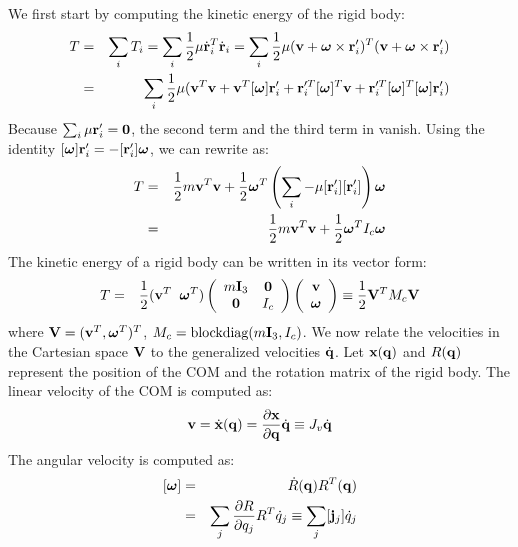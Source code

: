 We first start by computing the kinetic energy of the rigid body:
\begin{eqnarray}
\label{eq:rigid_kinetic}
T &=& \sum_i T_i = \sum_i \frac{1}{2}  \mathbf{\mu} \dot{\mathbf{r}}_i^{T}
    \dot{\mathbf{r}}_i = \sum_i \frac{1}{2}  \mathbf{\mu} (\mathbf{v} + \bm{\omega}
    \times \mathbf{r}_i')^T (\mathbf{v} + \boldsymbol{\bm{\omega}}
    \times \mathbf{r}_i') \nonumber \\
 &=& \sum_i \frac{1}{2}  \mathbf{\mu} (\mathbf{v}^T\mathbf{v} +
    \mathbf{v}^T [\bm{\omega}] \mathbf{r}_i' + \mathbf{r}_i'^T [\bm{\omega}]^T \mathbf{v} +
    \mathbf{r}_i'^T [\bm{\omega}]^T [\bm{\omega}] \mathbf{r}_i')
\end{eqnarray}
Because $\sum_i \mathbf{\mu}
\mathbf{r}_i' = \mathbf{0}$, the second term and the third term in  vanish. Using the identity $[\bm{\omega}]\mathbf{r}_i' =
-[\mathbf{r}_i']\bm{\omega}$, we can rewrite 
as:
\begin{eqnarray}
\nonumber
T & = & \frac{1}{2} m \mathbf{v}^T\mathbf{v} + \frac{1}{2} \bm{\omega}^T \left ( \sum_i -\mathbf{\mu}
 [\mathbf{r}_i'][\mathbf{r}_i'] \right ) \bm{\omega}\\
 & = & \frac{1}{2} m \mathbf{v}^T\mathbf{v} + \frac{1}{2} \bm{\omega}^T I_c \bm{\omega}
\end{eqnarray}
The kinetic energy of a rigid body can be written in its vector form:
\begin{eqnarray}
\label{eq:kinetic_vec}
T &=& \frac{1}{2} (\mathbf{v}^T \;\; \bm{\omega}^T)
\left(
\begin{array}{cc}
m\mathbf{I}_3 & \mathbf{0} \\
\mathbf{0} & I_c
\end{array}
\right)
\left(
\begin{array}{c}
\mathbf{v} \\
\bm{\omega} 
\end{array}
\right)
 \equiv \frac{1}{2}\mathbf{V}^T M_c \mathbf{V}
\end{eqnarray}
where $\mathbf{V} = (\mathbf{v}^T,\bm{\omega}^T)^T$, $M_c = \mbox{blockdiag}(m\mathbf{I}_3,I_c)$. We now relate the velocities in the Cartesian space $\mathbf{V}$ to the generalized velocities $\dot{\mathbf{q}}$. Let $\mathbf{x}(\mathbf{q})$ and $R(\mathbf{q})$ represent the position of the COM and the rotation matrix of the rigid body. The linear velocity of the COM is computed as:
\begin{eqnarray}
\label{eq:vellin}
\mathbf{v} = \dot{\mathbf{x}}(\mathbf{q}) = \frac{\partial \mathbf{x}}{\partial \mathbf{q}} \dot{\mathbf{q}} \equiv J_v \dot{\mathbf{q}}
\end{eqnarray}
The angular velocity is computed as:
\begin{eqnarray}
\nonumber
[\bm{\omega}] & = & \dot{R}(\mathbf{q})R^T(\mathbf{q}) \\
\label{eq:Jaccolj}
& = & \sum_j \frac{\partial R}{\partial q_j}R^T \dot{q}_j \equiv \sum_j [\mathbf{j}_{j}] \dot{q}_j
\end{eqnarray}

